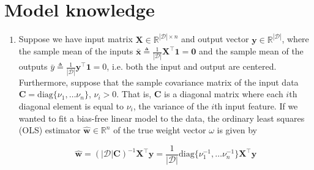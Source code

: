 \documentclass{article}
\numberwithin{equation}{section}
\begin{document}
\section{Model knowledge}

\begin{enumerate}
    \item
    Suppose we have input matrix $ \mathbf{X} \in
    \mathbb{R}^{|\mathcal{D}| \times n} $ and output vector $ \mathbf{y} \in
    \mathbb{R}^{|\mathcal{D}|} $, where the sample mean of the inputs
    $ \bar{\mathbf{x}} \triangleq
    \frac{1}{|\mathcal{D}|}\mathbf{X}^\top\mathbf{1} = \mathbf{0} $ and the
    sample mean of the outputs $ \bar{y} \triangleq \frac{1}{|\mathcal{D}|}
    \mathbf{y}^\top\mathbf{1} = 0 $, i.e. both the input and output are
    centered. Furthermore, suppose that the sample covariance matrix of the
    input data $ \mathbf{C} = \mathrm{diag}\{\nu_1, \ldots \nu_n\} $,
    $ \nu_i > 0 $. That is, $ \mathbf{C} $ is a diagonal matrix where each
    $ i $th diagonal element is equal to $ \nu_i $, the variance of the $ i $th
    input feature. If we wanted to fit a bias-free\footnotemark{} linear model to the data, the ordinary least squares (OLS) estimator
    $ \hat{\mathbf{w}} \in \mathbb{R}^n $ of the true weight vector $ \omega $
    is given by

    \begin{equation*}
        \hat{\mathbf{w}} =
        (|\mathcal{D}|\mathbf{C})^{-1}\mathbf{X}^\top\mathbf{y} =
        \frac{1}{|\mathcal{D}|}\mathrm{diag}\{\nu_1^{-1}, \ldots \nu_n^{-1}\}
        \mathbf{X}^\top\mathbf{y}
    \end{equation*}


\end{enumerate}
\end{document}
